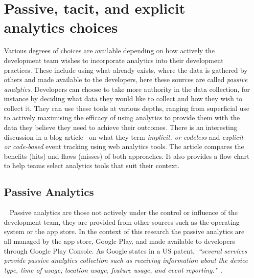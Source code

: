 \section{Passive, tacit, and explicit analytics choices}
Various degrees of choices are available depending on how actively the development team wishes to incorporate analytics into their development practices. These include using what already exists, where the data is gathered by others and made available to the developers, here these sources are called \emph{passive analytics}. Developers can choose to take more authority in the data collection, for instance by deciding what data they would like to collect and how they wish to collect it. They can use these tools at various depths, ranging from superficial use to actively maximising the efficacy of using analytics to provide them with the data they believe they need to achieve their outcomes. There is an interesting discussion in a blog article~\cite{mukherjee_implicit_versus_explicit_event_tracking_hits_and_misses} on what they term \emph{implicit, or codeless} and \emph{explicit or code-based} event tracking using web analytics tools. The article compares the benefits (hits) and flaws (misses) of both approaches. It also provides a flow chart to help teams select analytics tools that suit their context.



\subsection{Passive Analytics}~\label{subsection-passive-analytics}
Passive analytics are those not actively under the control or influence of the development team, they are provided from other sources such as the operating system or the app store. In the context of this research the passive analytics are all managed by the app store, Google Play, and made available to developers through Google Play Console. As Google states in a US patent,~\emph{``several services provide passive analytics collection such as receiving information about the device type, time of usage, location usage, feature usage, and event reporting."}~\cite{googlepatent_hyman2016_collecting_application_usage_analytics}.  



